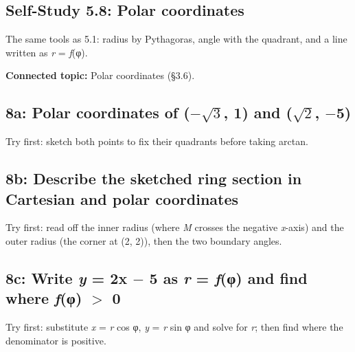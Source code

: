 \documentclass[11pt]{article}
\begin{document}
\begin{keepsection}
\section{Self-Study 5.8: Polar coordinates}

The same tools as 5.1: radius by Pythagoras, angle with the quadrant, and a line written as \textit{r} = \textit{f}(φ).

\textbf{Connected topic:} Polar coordinates (§3.6).

\begin{keepsection}
\subsection{8a: Polar coordinates of (\ensuremath{-}\ensuremath{\sqrt{3}}, 1) and (\ensuremath{\sqrt{2}}, \ensuremath{-}5)}

Try first: sketch both points to fix their quadrants before taking arctan.

\end{keepsection}

\begin{keepsection}
\subsection{8b: Describe the sketched ring section in Cartesian and polar coordinates}

Try first: read off the inner radius (where \textit{M} crosses the negative \textit{x}-axis) and the outer radius (the corner at (2, 2)), then the two boundary angles.

\end{keepsection}

\begin{keepsection}
\subsection{8c: Write \textit{y} = 2x \ensuremath{-} 5 as \textit{r} = \textit{f}(φ) and find where \textit{f}(φ) \ensuremath{>} 0}

Try first: substitute \textit{x} = \textit{r} cos φ, \textit{y} = \textit{r} sin φ and solve for \textit{r}; then find where the denominator is positive.

\end{keepsection}
\end{keepsection}
\end{document}
